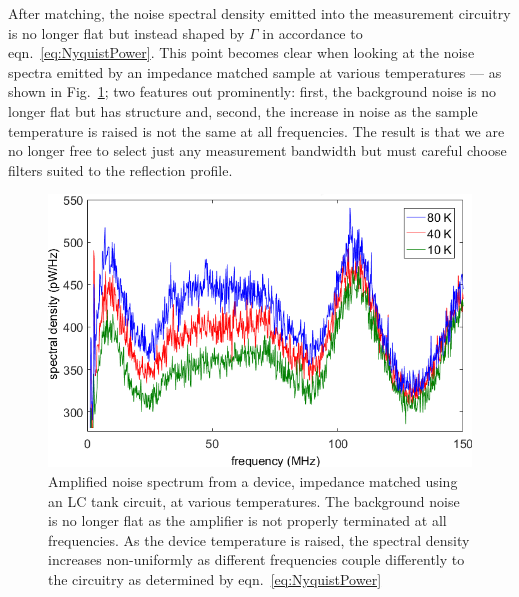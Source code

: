 After matching, the noise spectral density emitted into the measurement circuitry is no longer flat but instead shaped by $\Gamma$ in accordance to eqn.~\ref{eq:NyquistPower}. This point becomes clear when looking at the noise spectra emitted by an impedance matched sample at various temperatures --- as shown in Fig.~\ref{fig:spectrum_matching}; two features out prominently: first, the background noise is no longer flat but has structure and, second, the increase in noise as the sample temperature is raised is not the same at all frequencies. The result is that we are no longer free to select just any measurement bandwidth but must careful choose filters suited to the reflection profile.
\begin{figure}
\centering
\includegraphics[width = 120mm]{figures/Johnson_noise_thermometry/Matched_spectra.png}
\caption{Amplified noise spectrum from a device, impedance matched using an LC tank circuit, at various temperatures. The background noise is no longer flat as the amplifier is not properly terminated at all frequencies. As the device temperature is raised, the spectral density increases non-uniformly as different frequencies couple differently to the circuitry as determined by eqn.~\ref{eq:NyquistPower}}
\label{fig:spectrum_matching}
\end{figure}

